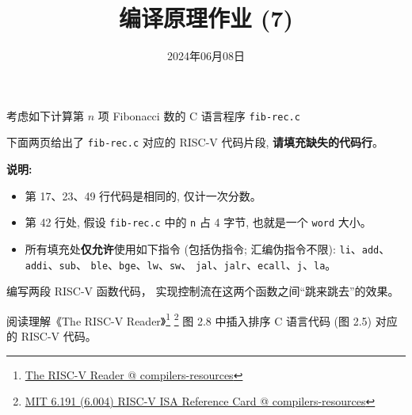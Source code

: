 \documentclass[a4paper, justified]{tufte-handout}
\title{编译原理作业 (7)}
\date{2024年06月08日}
\begin{document}
\maketitle
\noplagiarism %
\begin{abstract}
\end{abstract}
\beginrequired

\begin{problem}
	考虑如下计算第 $n$ 项 Fibonacci 数的 C 语言程序 \texttt{fib-rec.c}

	下面两页给出了 \texttt{fib-rec.c} 对应的 RISC-V 代码片段,
	{\bf 请填充缺失的代码行}。

	{\bf 说明:}
	\begin{itemize}
		\item 第 17、23、49 行代码是相同的, 仅计一次分数。
		\item 第 42 行处, 假设 \texttt{fib-rec.c} 中的 \texttt{n} 占 4 字节,
		  也就是一个 \texttt{word} 大小。
		\item 所有填充处{\bf 仅允许}使用如下指令 (包括伪指令; 汇编伪指令不限):
			\texttt{li}、\texttt{add}、\texttt{addi}、\texttt{sub}、
		  \texttt{ble}、\texttt{bge}、\texttt{lw}、\texttt{sw}、
			\texttt{jal}、\texttt{jalr}、\texttt{ecall}、\texttt{j}、\texttt{la}。
	\end{itemize}

\end{problem}


\begin{problem}
	编写两段 RISC-V 函数代码，
	实现控制流在这两个函数之间``跳来跳去''的效果。
\end{problem}

\begin{solution}
\end{solution}

\begin{problem}
	阅读理解《The RISC-V Reader》\footnote{\href{https://github.com/courses-at-nju-by-hfwei/compilers-resources/blob/master/material/riscv/The\%20RISC-V\%20Reader\%20An\%20Open\%20Architecture\%20Atlas\%20(Chinese\%20Translation).pdf}
	{The RISC-V Reader @ compilers-resources}}
	\footnote{\href{https://github.com/courses-at-nju-by-hfwei/compilers-resources/blob/master/material/riscv/MIT\%206.191\%20(6.004)\%20RISC-V\%20ISA\%20Reference\%20Card.pdf}{MIT 6.191 (6.004) RISC-V ISA Reference Card @ compilers-resources}}
	图 2.8 中插入排序 C 语言代码 (图 2.5)
	对应的 RISC-V 代码。
\end{problem}
\end{document}

